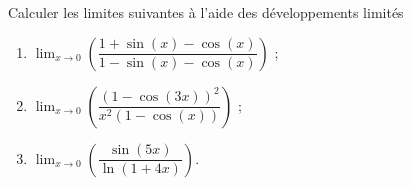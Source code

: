 
\begin{exercice}\label{exoanalyseCTU-0109}

 Calculer les limites suivantes à l'aide des développements limités
 \begin{multicols}{3}
   \begin{enumerate}
   \item $\displaystyle \lim_{x\to 0}\left(\dfrac{1+\sin (x)-\cos(x)}{1-\sin (x)-\cos(x)}\right)$ ;
   \item $\displaystyle \lim_{x\to 0}\left(\dfrac{(1-\cos(3x))^2}{x^2(1-\cos(x))}\right)$ ; 
   \item $\displaystyle \lim_{x\to 0}\left(\dfrac{\sin (5x)}{\ln(1+4x)}\right)$.
   \end{enumerate}
 \end{multicols}


\end{exercice}
